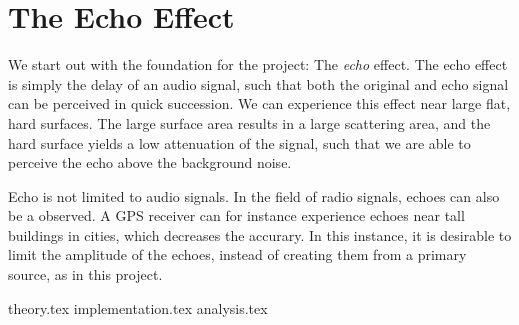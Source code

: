
\section{The Echo Effect}
We start out with the foundation for the project: The \emph{echo} effect. The echo effect is simply the delay of an audio signal, such that both the original and echo signal can be perceived in quick succession. We can experience this effect near large flat, hard surfaces. The large surface area results in a large scattering area, and the hard surface yields a low attenuation of the signal, such that we are able to perceive the echo above the background noise.

Echo is not limited to audio signals. In the field of radio signals, echoes can also be a observed. A GPS receiver can for instance experience echoes near tall buildings in cities, which decreases the accurary. In this instance, it is desirable to limit the amplitude of the echoes, instead of creating them from a primary source, as in this project.

{theory.tex}
{implementation.tex}
{analysis.tex}

